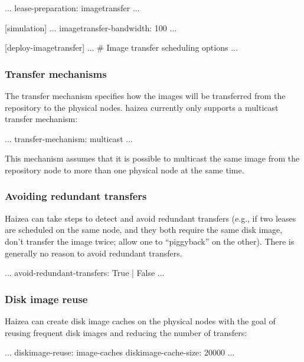 \begin{wideshellverbatim}
[general]
...
lease-preparation: imagetransfer
...

[simulation]
...
imagetransfer-bandwidth: 100
...

[deploy-imagetransfer]
...
\# Image transfer scheduling options
...
\end{wideshellverbatim}

\subsubsection{Transfer mechanisms}

The transfer mechanism specifies how the images will be transferred from the repository to the physical nodes. haizea currently only supports a multicast transfer mechanism:

\begin{wideshellverbatim}
...
transfer-mechanism: multicast
...
\end{wideshellverbatim}

This mechanism assumes that it is possible to multicast the same image from the repository node to more than one physical node at the same time.

\subsubsection{Avoiding redundant transfers}

Haizea can take steps to
detect and avoid redundant transfers (e.g., if two leases are
scheduled on the same node, and they both require the same disk
image, don't transfer the image twice; allow one to ``piggyback''
on the other). There is generally no reason to avoid redundant transfers.

\begin{wideshellverbatim}
...
avoid-redundant-transfers: True | False
...
\end{wideshellverbatim}


\subsubsection{Disk image reuse}

Haizea can create disk image caches on the physical nodes with the goal of reusing frequent disk images and reducing the number of transfers: 

\begin{wideshellverbatim}
...
diskimage-reuse: image-caches
diskimage-cache-size: 20000
...
\end{wideshellverbatim}


